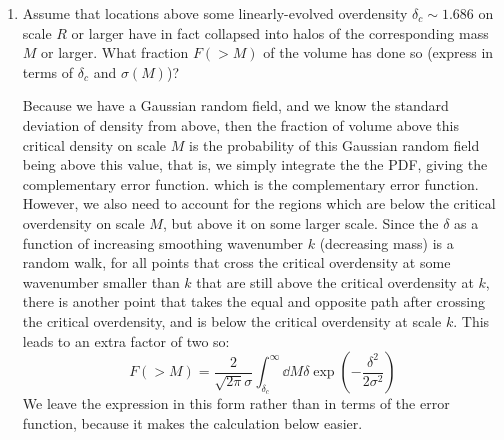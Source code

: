 \begin{enumerate}
\begin{enumerate}
\begin{answer}
\end{answer}
\item Assume that locations above some linearly-evolved
overdensity $\delta_c \sim 1.686$ on scale $R$ or larger have in fact
collapsed into halos of the corresponding mass $M$ or larger. What
fraction $F(>M)$ of the volume has done so (express in terms of $\delta_c$ and
$\sigma(M)$)?
\begin{answer}
    Because we have a Gaussian random field, and we know the standard
    deviation of density from above, then the fraction of volume above
    this critical density on scale $M$ is the probability of this
    Gaussian random field being above this value, that is, we simply
    integrate the the PDF, giving the complementary error function.
    which is the complementary error function. However, we also need
    to account for the regions which are below the critical overdensity on
    scale $M$, but above it on some larger scale. Since the $\delta$
    as a function of increasing smoothing wavenumber $k$ (decreasing
    mass) is a random walk, for all points that cross the critical
    overdensity at some wavenumber smaller than $k$ that are still above
    the critical overdensity at $k$, there is another point that takes the
    equal and opposite path after crossing the critical overdensity, and
    is below the critical overdensity at scale $k$. This leads to an
    extra factor of two so:
    \begin{equation}
        F(>M)
    = \frac{2}{\sqrt{2\pi}\sigma}\int^\infty_{\delta_c}\dd{M} \delta \exp\left(-\frac{\delta^2}{2\sigma^2}\right)
    \end{equation}
    We leave the expression in this form rather than in terms of the
    error function, because it makes the calculation below easier.
\end{answer}


\end{enumerate}
\end{enumerate}
